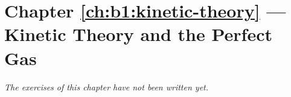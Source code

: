\section*{Chapter \ref{ch:b1:kinetic-theory} --- Kinetic Theory and the Perfect Gas}


\emph{The exercises of this chapter have not been written yet.}
